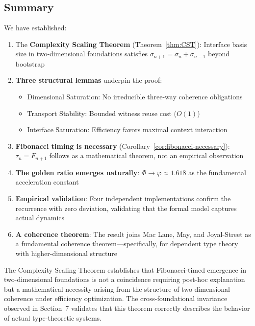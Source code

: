 \documentclass[11pt]{article}
\theoremstyle{definition}
\theoremstyle{remark}
\begin{document}
\subsection{Summary}

We have established:

\begin{enumerate}
\item The \textbf{Complexity Scaling Theorem} (Theorem~\ref{thm:CST}): Interface basis size in
two-dimensional foundations satisfies $\sigma_{n+1} = \sigma_n + \sigma_{n-1}$ beyond bootstrap

\item \textbf{Three structural lemmas} underpin the proof:
\begin{itemize}
\item Dimensional Saturation: No irreducible three-way coherence obligations
\item Transport Stability: Bounded witness reuse cost ($O(1)$)
\item Interface Saturation: Efficiency favors maximal context interaction
\end{itemize}

\item \textbf{Fibonacci timing is necessary} (Corollary~\ref{cor:fibonacci-necessary}): $\tau_n = F_{n+1}$
follows as a mathematical theorem, not an empirical observation

\item \textbf{The golden ratio emerges naturally}: $\Phi \to \varphi \approx 1.618$ as the fundamental
acceleration constant

\item \textbf{Empirical validation}: Four independent implementations confirm the recurrence with
zero deviation, validating that the formal model captures actual dynamics

\item \textbf{A coherence theorem}: The result joins Mac Lane, May, and Joyal-Street as a fundamental
coherence theorem---specifically, for dependent type theory with higher-dimensional structure
\end{enumerate}

The Complexity Scaling Theorem establishes that Fibonacci-timed emergence in two-dimensional
foundations is not a coincidence requiring post-hoc explanation but a mathematical necessity arising
from the structure of two-dimensional coherence under efficiency optimization. The cross-foundational
invariance observed in Section~7 validates that this theorem correctly describes the behavior of
actual type-theoretic systems.
\end{document}
